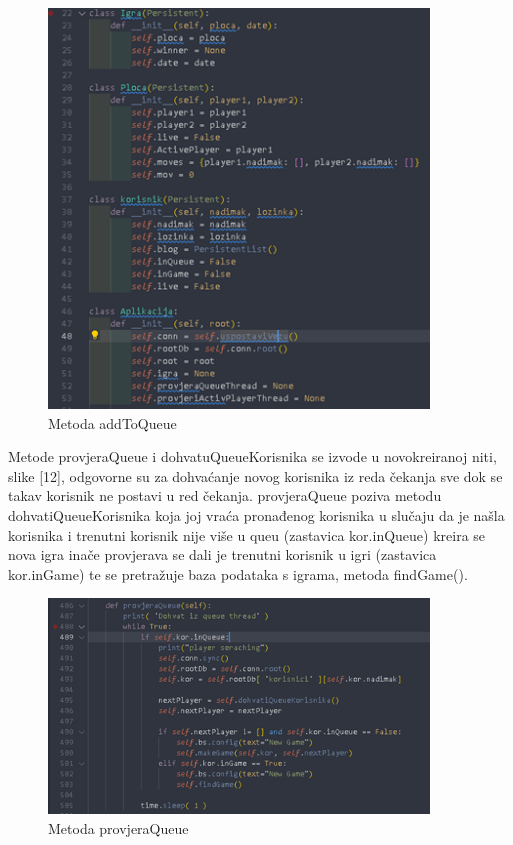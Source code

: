 \documentclass[]{foi} %
\begin{document}
\begin{figure}[]
    \centering
    \includegraphics[width=0.9\textwidth]{slike/impl_1.png}
    \caption{Metoda addToQueue \cite{Vlastita izrada}}
    \label{fig:podjela}
\end{figure}


Metode provjeraQueue i dohvatuQueueKorisnika se izvode u novokreiranoj niti, slike [12], odgovorne su za dohvaćanje novog korisnika iz reda čekanja sve dok se takav korisnik ne postavi u red čekanja.  provjeraQueue poziva metodu dohvatiQueueKorisnika koja joj vraća pronađenog korisnika  u slučaju da je našla korisnika i trenutni korisnik nije više u queu (zastavica kor.inQueue) kreira se nova igra inače provjerava se dali je trenutni korisnik u igri (zastavica kor.inGame) te se pretražuje baza podataka s igrama, metoda findGame().


\begin{figure}[]
    \centering
    \includegraphics[width=0.9\textwidth]{slike/impl_4.png}
    \caption{Metoda provjeraQueue \cite{Vlastita izrada}}
    \label{fig:podjela}
\end{figure}
\end{document}
